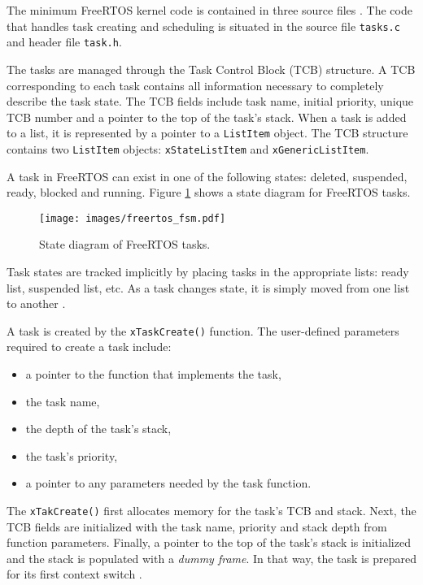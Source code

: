 The minimum FreeRTOS kernel code is contained in three source files \cite{brown2012architecture}. 
The code that handles task creating and scheduling is situated in the source file \verb$tasks.c$ and header file \verb$task.h$.

The tasks are managed through the Task Control Block (TCB) structure. 
A TCB corresponding to each task contains all information necessary to completely describe the task state. 
The TCB fields include task name, initial priority, unique TCB number and a pointer to the top of the task's stack. 
When a task is added to a list, it is represented by a pointer to a \verb$ListItem$ object. 
The TCB structure contains two \verb$ListItem$ objects: \verb$xStateListItem$ and \verb$xGenericListItem$.

A task in FreeRTOS can exist in one of the following states: deleted, suspended, ready, blocked and running. 
Figure \ref{freertos:state} shows a state diagram for FreeRTOS tasks. 

\begin{figure}[ht]
    \centering
    \texttt{[image: images/freertos\_fsm.pdf]}
    \caption{State diagram of FreeRTOS tasks.}
    \label{freertos:state}
\end{figure}

Task states are tracked implicitly by placing tasks in the appropriate lists: ready list, suspended list, etc. As a task changes state, it is simply moved from one list to another 
\cite{brown2012architecture}.

A task is created by the \verb$xTaskCreate()$ function. 
The user-defined parameters required to create a task include: 
\begin{itemize}
	\item a pointer to the function that implements the task,
	\item the task name,
	\item the depth of the task's stack,
	\item the task's priority,
	\item a pointer to any parameters needed by the task function.
\end{itemize}
The \verb$xTakCreate()$ first allocates memory for the task's TCB and stack.
Next, the TCB fields are initialized with the task name, priority and stack depth from function parameters. 
Finally, a pointer to the top of the task's stack is initialized and the stack is populated with a \textit{dummy frame}. 
In that way, the task is prepared for its first context switch \cite{goyette2007analysis}.

